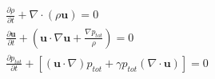 \documentclass[journal, onecolumn]{aastex631}
\begin{document}
\begin{CJK*}{UTF8}{gbsn}
\begin{appendix}
\begin{equation}\label{eq:plasma_single}
\begin{matrix}
\frac{\partial{\rho}}{\partial{t}} + \nabla\cdot(\rho \textbf{u}) = 0\\
\frac{\partial{\textbf{u}}}{\partial{t}}+(\textbf{u}\cdot\nabla\textbf{u}+\frac{\nabla p_{tot}}{\rho})=0\\
\frac{\partial{p_{tot}}}{\partial{t}}+[(\textbf{u}\cdot\nabla)p_{tot}+\gamma p_{tot}(\nabla\cdot\textbf{u}) ] = 0\\                                                                                                                                                                                                                                                                                                                                                                                   \end{matrix}
\end{equation}




\end{appendix}
\end{CJK*}
\end{document}
